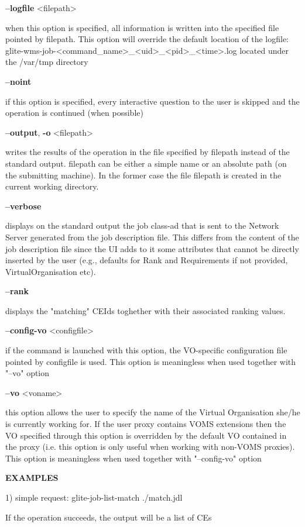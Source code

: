 {\textbf{--logfile} <filepath>

when this option is specified, all information is written into the specified file pointed by filepath.
This option will override the default location of the logfile:
glite-wms-job-<command\_name>\_<uid>\_<pid>\_<time>.log  located under the /var/tmp directory

\textbf{--noint}

if this option is specified, every interactive question to the user is skipped and the operation is continued (when possible)

\textbf{--output}, \textbf{-o} <filepath>

writes the results of the operation in the file specified by filepath instead of the standard output. filepath can be either a simple name or an absolute path (on the submitting machine). In the former case the file filepath is created in the current working directory.

\textbf{--verbose}

displays on the standard output the job class-ad that is sent to the Network Server generated from the job description file.
This differs from the content of the job description file since the UI adds to it some attributes that cannot be directly inserted by the user
(e.g., defaults for Rank and Requirements if not provided, VirtualOrganisation etc).

\textbf{--rank}

displays the "matching" CEIds toghether with their associated ranking values.

\textbf{--config-vo} <configfile>

if the command is launched with this option, the VO-specific configuration file pointed by configfile is used. This option is meaningless when used together with "--vo" option

\textbf{--vo} <voname>

this option allows the user to specify the name of the Virtual Organisation she/he is currently working for.
If the user proxy contains VOMS extensions then the VO specified through this option is overridden by the default VO contained in the proxy (i.e. this option is only useful when working with non-VOMS proxies).
This option is meaningless when used together with "--config-vo" option


\medskip
\textbf{EXAMPLES}
\smallskip


1) simple request:
glite-job-list-match ./match.jdl

If the operation succeeds, the output will be a list of CEs

}
